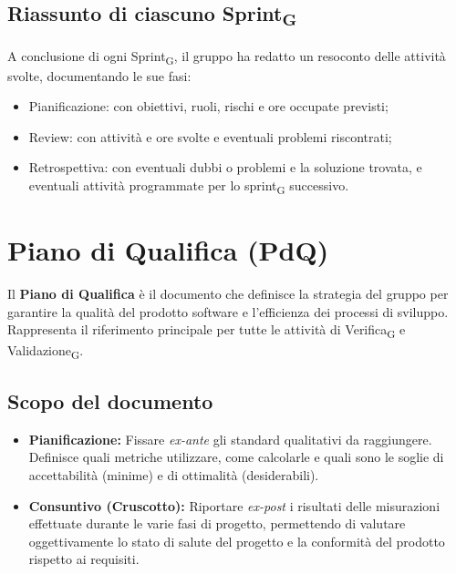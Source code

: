\documentclass[11pt,a4paper]{article}
\newcommand{\gls}[1]{#1\textsubscript{G}}
\begin{document}
\subsection{Riassunto di ciascuno \gls{Sprint}}
A conclusione di ogni \gls{Sprint}, il gruppo ha redatto un resoconto delle attività svolte, documentando le sue fasi:
\begin{itemize}
\item Pianificazione: con obiettivi, ruoli, rischi e ore occupate previsti;
\item Review: con attività e ore svolte e eventuali problemi riscontrati;
\item Retrospettiva: con eventuali dubbi o problemi e la soluzione trovata, e eventuali attività programmate per lo \gls{sprint} successivo. 
\end{itemize}

\newpage

\section{Piano di Qualifica (PdQ)}
Il \textbf{Piano di Qualifica} è il documento che definisce la strategia del gruppo per garantire la qualità del prodotto software e l'efficienza dei processi di sviluppo. Rappresenta il riferimento principale per tutte le attività di \gls{Verifica} e \gls{Validazione}.

\subsection{Scopo del documento}
\begin{itemize}
    \item \textbf{Pianificazione:} Fissare \textit{ex-ante} gli standard qualitativi da raggiungere. Definisce quali metriche utilizzare, come calcolarle e quali sono le soglie di accettabilità (minime) e di ottimalità (desiderabili).
    \item \textbf{Consuntivo (Cruscotto):} Riportare \textit{ex-post} i risultati delle misurazioni effettuate durante le varie fasi di progetto, permettendo di valutare oggettivamente lo stato di salute del progetto e la conformità del prodotto rispetto ai requisiti.
\end{itemize}
\end{document}
